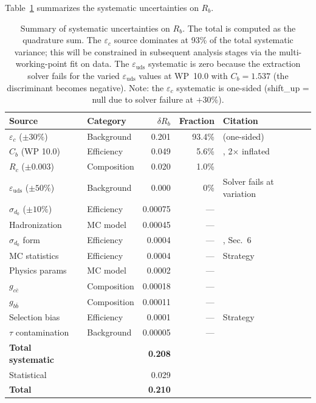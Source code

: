 \documentclass[11pt,a4paper]{article}
\begin{document}
Table~\ref{tab:syst_summary_rb} summarizes the systematic uncertainties on $R_b$.

\begin{table}[htbp]
\centering
\caption{Summary of systematic uncertainties on $R_b$. The total is computed as
the quadrature sum. The $\varepsilon_c$ source dominates at 93\% of
the total systematic variance; this will be constrained in subsequent analysis stages via the
multi-working-point fit on data. The $\varepsilon_\mathrm{uds}$ systematic is zero
because the extraction solver fails for the varied $\varepsilon_\mathrm{uds}$ values at
WP~10.0 with $C_b = 1.537$ (the discriminant becomes negative). Note: the
$\varepsilon_c$ systematic is one-sided (shift\_up = null due to solver failure at $+30\%$).}
\label{tab:syst_summary_rb}
\small
\begin{tabular}{llrrl}
\toprule
Source & Category & $\delta R_b$ & Fraction & Citation \\
\midrule
$\varepsilon_c$ ($\pm 30\%$) & Background & 0.201 & 93.4\% & \cite{LEP:HF:2001} (one-sided) \\
$C_b$ (WP 10.0) & Efficiency & 0.049 & 5.6\% & \cite{ALEPH:Rb:1996}, 2$\times$ inflated \\
$R_c$ ($\pm 0.003$) & Composition & 0.020 & 1.0\% & \cite{LEP:EWWG:2005} \\
$\varepsilon_\mathrm{uds}$ ($\pm 50\%$) & Background & 0.000 & 0\% & Solver fails at variation \\
$\sigma_{d_0}$ ($\pm 10\%$) & Efficiency & 0.00075 & --- & \cite{ALEPH:Rb:1996} \\
Hadronization & MC model & 0.00045 & --- & \cite{ALEPH:Rb:1996} \\
$\sigma_{d_0}$ form & Efficiency & 0.0004 & --- & \cite{ALEPH:Rb:1996}, Sec.~6 \\
MC statistics & Efficiency & 0.0004 & --- & Strategy \\
Physics params & MC model & 0.0002 & --- & \cite{PDG:2024} \\
$g_{c\bar{c}}$ & Composition & 0.00018 & --- & \cite{LEP:gcc} \\
$g_{b\bar{b}}$ & Composition & 0.00011 & --- & \cite{LEP:HF:2001} \\
Selection bias & Efficiency & 0.0001 & --- & Strategy \\
$\tau$ contamination & Background & 0.00005 & --- & \cite{ALEPH:sigma_had} \\
\midrule
\textbf{Total systematic} & & \textbf{0.208} & & \\
Statistical & & 0.029 & & \\
\midrule
\textbf{Total} & & \textbf{0.210} & & \\
\bottomrule
\end{tabular}
\end{table}
\end{document}
